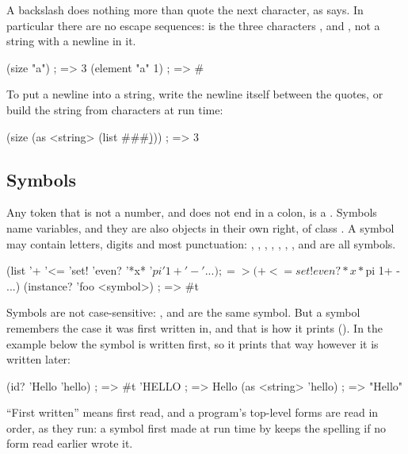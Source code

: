 \noindent A backslash does nothing more than quote the next character, as
 says. In particular there are no escape sequences:
 is the three characters ,  and
, not a string with a newline in it.

\begin{dylan}
(size "a\nb")      ; => 3
(element "a\nb" 1) ; => #\n
\end{dylan}

\noindent To put a newline into a string, write the newline itself between
the quotes, or build the string from characters at run time:

\begin{dylan}
(size (as <string> (list #\a #\newline #\b)))   ; => 3
\end{dylan}

\subsection{Symbols}\label{sec:syntax-symbols}

Any token that is not a number, and does not end in a colon, is a
. Symbols name variables, and they are also objects in their
own right, of class . A
symbol may contain letters, digits and most punctuation: \code{+},
\code{<=}, , , , , ,
\code{-} and  are all symbols.

\begin{dylan}
(list '+ '<= 'set! 'even? '*x* '$pi '1+ '- '...)
                       ; => (+ <= set! even? *x* $pi 1+ - ...)
(instance? 'foo <symbol>)   ; => #t
\end{dylan}

\noindent Symbols are not case-sensitive:
,  and  are the same symbol. But a symbol
remembers the case it was first written in, and that is how it prints
(). In the example below the symbol is written
 first, so it prints that way however it is written later:

\begin{dylan}
(id? 'Hello 'hello)        ; => #t
'HELLO                     ; => Hello
(as <string> 'hello)       ; => "Hello"
\end{dylan}

\noindent ``First written'' means first read, and a program's top-level
forms are read in order, as they run: a symbol first made at run time by
 keeps the spelling  if no form read
earlier wrote it.

